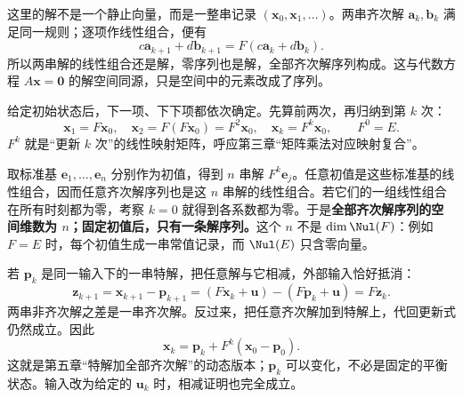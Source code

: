 \documentclass[a4paper,12pt,twoside,openany,fontset=none]{ctexbook}
\numberwithin{equation}{chapter}
\begin{document}

这里的解不是一个静止向量，而是一整串记录 $(\boldsymbol x_0,\boldsymbol x_1,\ldots)$。两串齐次解 $\boldsymbol a_k,\boldsymbol b_k$ 满足同一规则；逐项作线性组合，便有
\begin{equation}
 c\boldsymbol a_{k+1}+d\boldsymbol b_{k+1}
 =F(c\boldsymbol a_k+d\boldsymbol b_k).
\end{equation}
所以两串解的线性组合还是解，零序列也是解，全部齐次解序列构成。这与代数方程 $A\boldsymbol x=\boldsymbol0$ 的解空间同源，只是空间中的元素改成了序列。

给定初始状态后，下一项、下下项都依次确定。先算前两次，再归纳到第 $k$ 次：
\begin{equation}
 \boldsymbol x_1=F\boldsymbol x_0,\quad
 \boldsymbol x_2=F(F\boldsymbol x_0)=F^2\boldsymbol x_0,\quad
 \boldsymbol x_k=F^k\boldsymbol x_0,\qquad F^0=E.
\end{equation}
$F^k$ 就是“更新 $k$ 次”的线性映射矩阵，呼应第三章“矩阵乘法对应映射复合”。

取标准基 $\mathbf e_1,\ldots,\mathbf e_n$ 分别作为初值，得到 $n$ 串解 $F^k\mathbf e_j$。任意初值是这些标准基的线性组合，因而任意齐次解序列也是这 $n$ 串解的线性组合。若它们的一组线性组合在所有时刻都为零，考察 $k=0$ 就得到各系数都为零。于是\textbf{全部齐次解序列的空间维数为 $n$；固定初值后，只有一条解序列。}这个 $n$ 不是 $\dim\Nul(F)$：例如 $F=E$ 时，每个初值生成一串常值记录，而 $\Nul(E)$ 只含零向量。

若 $\boldsymbol p_k$ 是同一输入下的一串特解，把任意解与它相减，外部输入恰好抵消：
\begin{equation}
 \boldsymbol z_{k+1}
 =\boldsymbol x_{k+1}-\boldsymbol p_{k+1}
 =(F\boldsymbol x_k+\boldsymbol u)-(F\boldsymbol p_k+\boldsymbol u)
 =F\boldsymbol z_k.
\end{equation}
两串非齐次解之差是一串齐次解。反过来，把任意齐次解加到特解上，代回更新式仍然成立。因此
\begin{equation}
 \boldsymbol x_k=\boldsymbol p_k+F^k(\boldsymbol x_0-\boldsymbol p_0).
 \label{eq:five-discrete-general}
\end{equation}
这就是第五章“特解加全部齐次解”的动态版本；$\boldsymbol p_k$ 可以变化，不必是固定的平衡状态。输入改为给定的 $\boldsymbol u_k$ 时，相减证明也完全成立。
\end{document}
